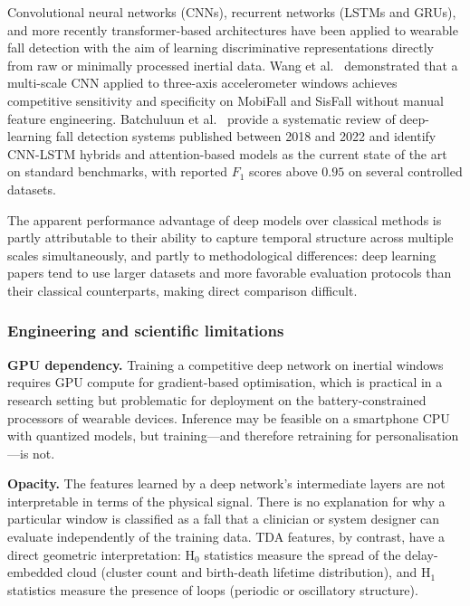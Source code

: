 \documentclass[onluarkali,ingilizce,yukseklisans,karton,LisansustuEgitim]{itutez}
\providecommand{\1}{\mathbf{1}}
\begin{document}
Convolutional neural networks (CNNs), recurrent networks (LSTMs and GRUs), and
more recently transformer-based architectures have been applied to wearable fall
detection with the aim of learning discriminative representations directly from
raw or minimally processed inertial data.  Wang et al.~\parencite{wang2020falldl}
demonstrated that a multi-scale CNN applied to three-axis accelerometer windows
achieves competitive sensitivity and specificity on MobiFall and SisFall without
manual feature engineering.  Batchuluun et al.~\parencite{batchuluun2022deep} provide
a systematic review of deep-learning fall detection systems published between 2018
and 2022 and identify CNN-LSTM hybrids and attention-based models as the current
state of the art on standard benchmarks, with reported $F_1$ scores above $0.95$
on several controlled datasets.

The apparent performance advantage of deep models over classical methods is partly
attributable to their ability to capture temporal structure across multiple scales
simultaneously, and partly to methodological differences: deep learning papers tend
to use larger datasets and more favorable evaluation protocols than their classical
counterparts, making direct comparison difficult.

\subsubsection{Engineering and scientific limitations}

\textbf{GPU dependency.}  Training a competitive deep network on inertial windows
requires GPU compute for gradient-based optimisation, which is practical in a
research setting but problematic for deployment on the battery-constrained processors
of wearable devices.  Inference may be feasible on a smartphone CPU with quantized
models, but training---and therefore retraining for personalisation---is not.

\textbf{Opacity.}  The features learned by a deep network's intermediate layers are
not interpretable in terms of the physical signal.  There is no explanation for why
a particular window is classified as a fall that a clinician or system designer can
evaluate independently of the training data.  TDA features, by contrast, have a direct
geometric interpretation: H$_0$ statistics measure the spread of the delay-embedded
cloud (cluster count and birth-death lifetime distribution), and H$_1$ statistics
measure the presence of loops (periodic or oscillatory structure).
\end{document}

